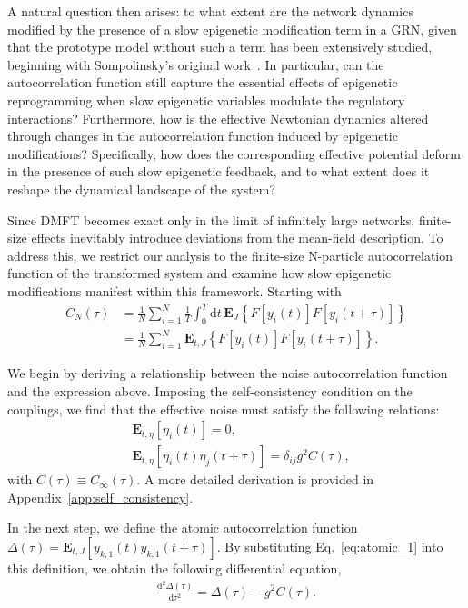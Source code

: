 \documentclass[reprint,amsmath,amssymb,aps]{revtex4-2}
\begin{document}
A natural question then arises: to what extent are the network dynamics modified by the presence of a slow epigenetic modification term in a GRN, given that the prototype model without such a term has been extensively studied, beginning with Sompolinsky’s original work~\cite{Sompolinsky1988}. In particular, can the autocorrelation function still capture the essential effects of epigenetic reprogramming when slow epigenetic variables modulate the regulatory interactions? Furthermore, how is the effective Newtonian dynamics altered through changes in the autocorrelation function induced by epigenetic modifications? Specifically, how does the corresponding effective potential deform in the presence of such slow epigenetic feedback, and to what extent does it reshape the dynamical landscape of the system?

Since DMFT becomes exact only in the limit of infinitely large networks, finite-size effects inevitably introduce deviations from the mean-field description. To address this, we restrict our analysis to the finite-size N-particle autocorrelation function of the transformed system and examine how slow epigenetic modifications manifest within this framework. Starting with
\begin{align}
C_N(\tau) &= \frac{1}{N} \sum_{i=1}^N \frac{1}{T} \int_0^T \mathrm{d}t \, \mathbf{E}_J \left\{ F[y_i(t)] F[y_i(t+\tau)]\right\} \nonumber\\
\label{eq:emperical_auto_correlation}
&=\frac{1}{N}\sum_{i=1}^N \mathbf{E}_{t,J} \left\{ F[y_i(t)] F[y_i(t+\tau)] \right\}.
\end{align}

We begin by deriving a relationship between the noise autocorrelation function and the expression above. Imposing the self-consistency condition on the couplings, we find that the effective noise must satisfy the following relations:
\begin{align*}
   &\mathbf{E}_{t,\eta} \left[\eta_i(t)\right] = 0,\\
   &\mathbf{E}_{t,\eta} \left[\eta_i(t) \eta_j(t+\tau)\right]
    =
    \delta_{ij} g^2 C(\tau),
\end{align*}
with $ C(\tau) \equiv C_\infty(\tau)$.
A more detailed derivation is provided in Appendix~\ref{app:self_consistency}.

In the next step, we define the atomic autocorrelation function $\Delta(\tau) = \mathbf{E}_{t,J} \left[ y_{k,1}(t) y_{k,1}(t+\tau) \right]$. By substituting Eq.~\eqref{eq:atomic_1} into this definition, we obtain the following differential equation,
\begin{align}
    \label{eq:pde_autocorrelation}
    \frac{\mathrm{d}^2 \Delta(\tau)}{\mathrm{d}\tau^2} = \Delta(\tau) - g^2 C(\tau).
\end{align}
\end{document}

